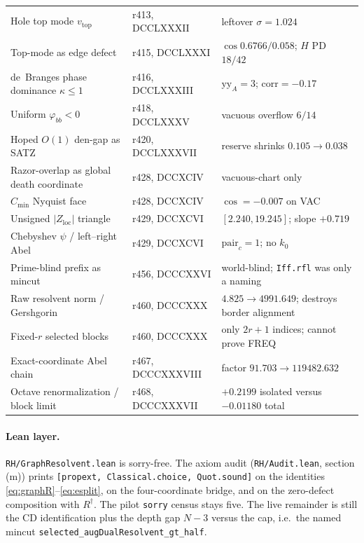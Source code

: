 \documentclass[11pt]{article}
\theoremstyle{remark}
\newcommand{\Rd}{R^{\dagger}}
\newcommand{\Zloc}{Z_{\mathrm{loc}}}
\begin{document}
\begin{table}[ht]
{\begin{tabular}{@{}llp{5.4cm}@{}}
Hole top mode $v_{\mathrm{top}}$
  & r413, DCCLXXXII & leftover $\sigma=1.024$ \\
Top-mode as edge defect
  & r415, DCCLXXXI & $\cos0.6766/0.058$; $H$ PD $18/42$ \\
de~Branges phase dominance $\kappa\le1$
  & r416, DCCLXXXIII & $\mathrm{yy}_{A}=3$; $\mathrm{corr}=-0.17$ \\
Uniform $\varphi_{bb}<0$
  & r418, DCCLXXXV & vacuous overflow $6/14$ \\
Hoped $O(1)$ den-gap as SATZ
  & r420, DCCLXXXVII & reserve shrinks $0.105\to0.038$ \\
Razor-overlap as global death coordinate
  & r428, DCCXCIV & vacuous-chart only \\
$C_{\min}$ Nyquist face
  & r428, DCCXCIV & $\cos=-0.007$ on VAC \\
Unsigned $|\Zloc|$ triangle
  & r429, DCCXCVI & $[2.240,19.245]$; slope $+0.719$ \\
Chebyshev $\psi$ / left--right Abel
  & r429, DCCXCVI & $\mathrm{pair}_{c}=1$; no $k_{0}$ \\
Prime-blind prefix as mincut
  & r456, DCCCXXVI & world-blind; \texttt{Iff.rfl} was only a naming \\
Raw resolvent norm / Gershgorin
  & r460, DCCCXXX & $4.825\to4991.649$; destroys border alignment \\
Fixed-$r$ selected blocks
  & r460, DCCCXXX & only $2r+1$ indices; cannot prove FREQ \\
Exact-coordinate Abel chain
  & r467, DCCCXXXVIII & factor $91.703\to119482.632$ \\
Octave renormalization / block limit
  & r468, DCCCXXXVII & $+0.2199$ isolated versus $-0.01180$ total \\
\bottomrule
\end{tabular}}
\end{table}

\paragraph{Lean layer.}
\texttt{RH/GraphResolvent.lean} is sorry-free.  The axiom audit
(\texttt{RH/Audit.lean}, section (m)) prints
\texttt{[propext, Classical.choice, Quot.sound]} on the identities
\eqref{eq:graphR}--\eqref{eq:esplit}, on the four-coordinate
bridge, and on the zero-defect composition with $\Rd$.
The pilot \texttt{sorry} census stays five.  The live remainder is
still the CD identification plus the depth gap $N-3$ versus the
cap, i.e.\ the named mincut
\texttt{selected\_augDualResolvent\_gt\_half}.
\end{document}
